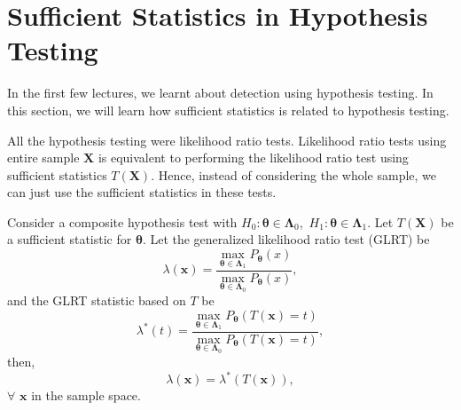 \documentclass[a4paper,english,12pt]{article}
\newcommand{\bx}{\mathbf{x}}
\newcommand{\bX}{\mathbf{X}}
\newcommand{\btheta}{\boldsymbol{\theta}}
\newcommand{\bLambda}{\boldsymbol{\Lambda}}
\begin{document}
\section{Sufficient Statistics in Hypothesis Testing}
 In the first few lectures, we learnt about detection using hypothesis testing. In this section, we will learn how sufficient statistics is related to hypothesis testing.
\par All the hypothesis testing were likelihood ratio tests. Likelihood ratio tests using entire sample $\bX$ is equivalent to performing the likelihood ratio test using sufficient statistics $T(\bX)$. Hence, instead of considering the whole sample, we can just use the sufficient statistics in these tests.

\begin{thm}
Consider a composite hypothesis test with $H_0:\btheta\in{\bLambda}_0$,~$H_1:\btheta\in{\bLambda}_1$. Let $T(\bX)$ be a sufficient statistic for $\btheta$. Let the generalized likelihood ratio test (GLRT) be 
\begin{equation}
\lambda(\bx) =\dfrac{\displaystyle\max_{\btheta\in{\bLambda}_1} P_{\btheta}(x)}{\displaystyle\max_{\btheta\in{\bLambda}_0} P_{\btheta}(x)},
\end{equation}
and the GLRT statistic based on $T$ be
\begin{equation}
\lambda^*(t) =\dfrac{\displaystyle\max_{\btheta\in{\bLambda}_1} P_{\btheta}(T(\bx)=t)}{\displaystyle\max_{\btheta\in{\bLambda}_0} P_{\btheta}(T(\bx)=t)},
\end{equation}
then, 
\begin{equation}
\lambda(\bx) = \lambda^*(T(\bx)), 
\end{equation}
$\forall$ $\bx$ in the sample space.
\end{thm}
\end{document}
